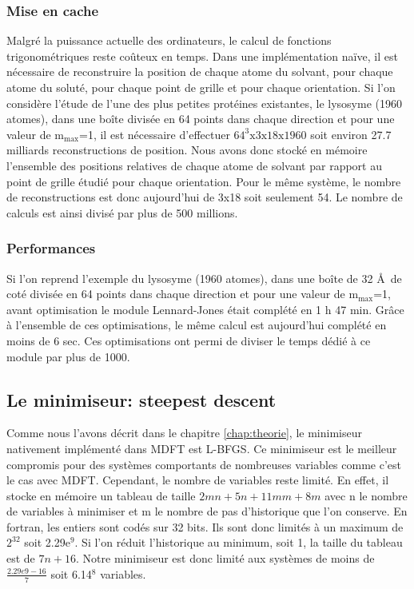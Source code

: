 \subsubsection{Mise en cache}
Malgré la puissance actuelle des ordinateurs, le calcul de fonctions trigonométriques reste coûteux en temps. Dans une implémentation naïve, il est nécessaire de reconstruire la position de chaque atome du solvant, pour chaque atome du soluté, pour chaque point de grille et pour chaque orientation. Si l'on considère l'étude de l'une des plus petites protéines existantes, le lysosyme (1960 atomes), dans une boîte divisée en 64 points dans chaque direction et pour une valeur de $\mathrm{m}_\mathrm{max}$=1, il est nécessaire d'effectuer $64^3\mathrm{x}3\mathrm{x}18\mathrm{x}1960$ soit environ 27.7 milliards reconstructions de position. Nous avons donc stocké en mémoire l'ensemble des positions relatives de chaque atome de solvant par rapport au point de grille étudié pour chaque orientation. Pour le même système, le nombre de reconstructions est donc aujourd'hui de 3x18 soit seulement 54. Le nombre de calculs est ainsi divisé par plus de 500 millions.


\subsubsection{Performances}
Si l'on reprend l'exemple du lysosyme (1960 atomes), dans une boîte de 32 \AA\ de coté divisée en 64 points dans chaque direction et pour une valeur de $\mathrm{m}_\mathrm{max}$=1, avant optimisation le module Lennard-Jones était complété en 1 h 47 min. Grâce à l'ensemble de ces optimisations, le même calcul est aujourd'hui complété en moins de 6 sec. Ces optimisations ont permi de diviser le temps dédié à ce module par plus de 1000.


\subsection{Le minimiseur: steepest descent}
Comme nous l'avons décrit dans le chapitre \ref{chap:theorie}, le minimiseur nativement implémenté dans MDFT est L-BFGS. Ce minimiseur est le meilleur compromis pour des systèmes comportants de nombreuses variables comme c'est le cas avec MDFT. Cependant, le nombre de variables reste limité. En effet, il stocke en mémoire un tableau de taille $2mn + 5n + 11mm + 8m$ avec n le nombre de variables à minimiser et m le nombre de pas d'historique que l'on conserve. En fortran, les entiers sont codés sur 32 bits. Ils sont donc limités à un maximum de $2^{32}$ soit 2.29e$^9$. Si l'on réduit l'historique au minimum, soit 1, la taille du tableau est de $7n+16$. Notre minimiseur est donc limité aux systèmes de moins de $\frac{2.29e9-16}{7}$ soit 6.14$^{8}$ variables. 

